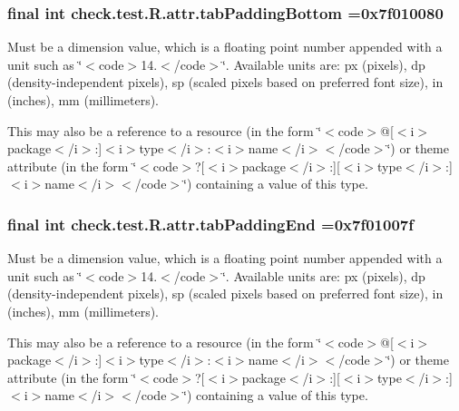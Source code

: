 \subsubsection[{tab\+Padding\+Bottom}]{\setlength{\rightskip}{0pt plus 5cm}final int check.\+test.\+R.\+attr.\+tab\+Padding\+Bottom =0x7f010080\hspace{0.3cm}{\ttfamily [static]}}\label{classcheck_1_1test_1_1_r_1_1attr_aa4e3f622e42c4b3fd08ed0f5308d4b2c}
Must be a dimension value, which is a floating point number appended with a unit such as \char`\"{}$<$code$>$14.\+5sp$<$/code$>$\char`\"{}. Available units are\+: px (pixels), dp (density-\/independent pixels), sp (scaled pixels based on preferred font size), in (inches), mm (millimeters). 

This may also be a reference to a resource (in the form \char`\"{}$<$code$>$@\mbox{[}$<$i$>$package$<$/i$>$\+:\mbox{]}$<$i$>$type$<$/i$>$\+:$<$i$>$name$<$/i$>$$<$/code$>$\char`\"{}) or theme attribute (in the form \char`\"{}$<$code$>$?\mbox{[}$<$i$>$package$<$/i$>$\+:\mbox{]}\mbox{[}$<$i$>$type$<$/i$>$\+:\mbox{]}$<$i$>$name$<$/i$>$$<$/code$>$\char`\"{}) containing a value of this type. \hypertarget{classcheck_1_1test_1_1_r_1_1attr_a5d95af079992521323154cf2aa35dfaa}{}
\subsubsection[{tab\+Padding\+End}]{\setlength{\rightskip}{0pt plus 5cm}final int check.\+test.\+R.\+attr.\+tab\+Padding\+End =0x7f01007f\hspace{0.3cm}{\ttfamily [static]}}\label{classcheck_1_1test_1_1_r_1_1attr_a5d95af079992521323154cf2aa35dfaa}
Must be a dimension value, which is a floating point number appended with a unit such as \char`\"{}$<$code$>$14.\+5sp$<$/code$>$\char`\"{}. Available units are\+: px (pixels), dp (density-\/independent pixels), sp (scaled pixels based on preferred font size), in (inches), mm (millimeters). 

This may also be a reference to a resource (in the form \char`\"{}$<$code$>$@\mbox{[}$<$i$>$package$<$/i$>$\+:\mbox{]}$<$i$>$type$<$/i$>$\+:$<$i$>$name$<$/i$>$$<$/code$>$\char`\"{}) or theme attribute (in the form \char`\"{}$<$code$>$?\mbox{[}$<$i$>$package$<$/i$>$\+:\mbox{]}\mbox{[}$<$i$>$type$<$/i$>$\+:\mbox{]}$<$i$>$name$<$/i$>$$<$/code$>$\char`\"{}) containing a value of this type. \hypertarget{classcheck_1_1test_1_1_r_1_1attr_a196c7359dff257a9caccdbaa14a63e0b}{}
